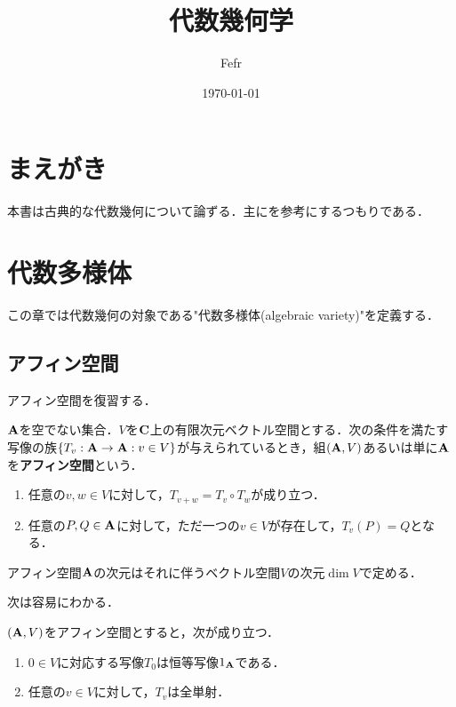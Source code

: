 \documentclass{myclass}
\title{代数幾何学}
\author{Fefr}
\date{\today}
\begin{document}
\maketitle

\tableofcontents

\frontmatter

\chapter*{まえがき}
本書は古典的な代数幾何について論ずる．主に\cite{Nakano}を参考にするつもりである．


\cleardoublepage

\mainmatter
\chapter{代数多様体}
この章では代数幾何の対象である"代数多様体(algebraic variety)"を定義する．

\section{アフィン空間}
アフィン空間を復習する．\\
\begin{definition}
  $\mathbf{A}$を空でない集合．$V$を$\mathbf{C}$上の有限次元ベクトル空間とする．次の条件を満たす写像の族$\{T_v:\mathbf{A} \to \mathbf{A} :v\in V\}$が与えられているとき，組$(\mathbf{A},V)$あるいは単に$\mathbf{A}$を\textbf{アフィン空間}という．
  \begin{enumerate}
    \item 任意の$v,w\in V$に対して，$T_{v+w} = T_v \circ T_w$が成り立つ．
    \item 任意の$P,Q\in \mathbf{A}$に対して，ただ一つの$v\in V$が存在して，$T_v(P) = Q$となる．
  \end{enumerate}
\end{definition}

\begin{definition}
  アフィン空間$\mathbf{A}$の次元はそれに伴うベクトル空間$V$の次元$\dim V$で定める．
\end{definition}


次は容易にわかる．

\begin{proposition}
  $(\mathbf{A},V)$をアフィン空間とすると，次が成り立つ．
  \begin{enumerate}
    \item $0\in V$に対応する写像$T_0$は恒等写像$1_{\mathbf{A}}$である．
    \item 任意の$v\in V$に対して，$T_v$は全単射．
  \end{enumerate}
\end{proposition}
\end{document}
